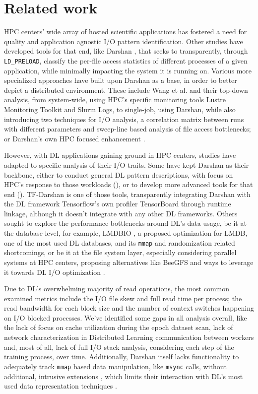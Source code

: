 \documentclass[conference]{IEEEtran}
\begin{document}
\section{Related work}


HPC centers' wide array of hosted scientific applications has fostered a need for quality and application agnostic I/O pattern identification. Other studies have developed tools for that end, like Darshan \cite{HPCIO24/7}, that seeks to transparently, through \texttt{LD\_PRELOAD}, classify the per-file access statistics of different processes of a given application, while minimally impacting the system it is running on. Various more specialized approaches have built upon Darshan as a base, in order to better depict a distributed environment. These include Wang et al. \cite{zoomin} and their top-down analysis, from system-wide, using HPC's specific monitoring tools Lustre Monitoring Toolkit and Slurm Logs, to single-job, using Darshan, while also introducing two techniques for I/O analysis, a correlation matrix between runs with different parameters and sweep-line based analysis of file access bottlenecks; or Darshan's own HPC focused enhancement \cite{HPCIODarshan}. 

However, with DL applications gaining ground in HPC centers, studies have adapted to specific analysis of their I/O traits. Some have kept Darshan as their backbone, either to conduct general DL pattern descriptions, with focus on HPC's response to those workloads (\cite{IOHPCDLBOOK,CharacterizationMLIOLeadHPC, UnderstandingDLIOHPC}), or to develop more advanced tools for that end (\cite{DFTracerAIHPC}). TF-Darshan \cite{tfdarshan} is one of those tools, transparently integrating Darshan with the DL framework Tensorflow's own profiler TensorBoard through runtime linkage, although it doesn't integrate with any other DL frameworks. Others sought to explore the performance bottlenecks around DL's data usage, be it at the database level, for example, LMDBIO \cite{LMDB}, a proposed optimization for LMDB, one of the most used DL databases, and its \texttt{mmap} and randomization related shortcomings, or be it at the file system layer, especially considering parallel systems at HPC centers, proposing alternatives like BeeGFS \cite{beegfs} and ways to leverage it towards DL I/O optimization \cite{beegfsDL}.

Due to DL's overwhelming majority of read operations, the most common examined metrics include the I/O file skew and full read time per process; the read bandwidth for each block size and the number of context switches happening on I/O blocked processes. We've identified some gaps in all analysis overall, like the lack of focus on cache utilization during the epoch dataset scan, lack of network characterization in Distributed Learning communication between workers and, most of all, lack of full I/O stack analysis, considering each step of the training process, over time. Additionally, Darshan itself lacks functionality to adequately track \texttt{mmap} based data manipulation, like \texttt{msync} calls, without additional, intrusive extensions \cite{tfdarshan}, which limits their interaction with DL's most used data representation techniques \cite{LMDB}. 
\end{document}
